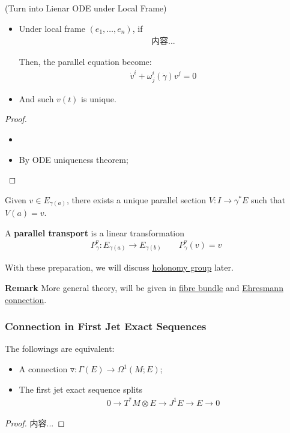 \documentclass[Total.tex]{subfiles}
\begin{document}
				
				\begin{proposition}
					(Turn into Lienar ODE under Local Frame) 
					\begin{itemize}
						\item Under local frame $(e_1,\dots,e_n)$, if 
						\begin{gather*}
							内容...
						\end{gather*}
						
						Then, the parallel equation become:
						\begin{gather*}
							\dot{v}^i+\omega^i_j(\dot{\gamma})v^j=0
						\end{gather*}
						\item And such $v(t)$ is unique. 
					\end{itemize}
				\end{proposition}
				\begin{proof}
					\begin{itemize}
						\item 
						\item By ODE uniqueness theorem;
					\end{itemize}
				\end{proof}
				
				
				
				\begin{Def}
					Given $v\in E_{\gamma(a)}$, there exists a unique parallel section $V:I\rightarrow \gamma^*E$ such that $V(a)=v$.
					
					A \textbf{parallel transport} is a linear transformation
					\begin{gather*}
						P^\triangledown_\gamma:E_{\gamma(a)}\rightarrow E_{\gamma(b)}\qquad P^\triangledown_\gamma(v)=v
					\end{gather*}
				\end{Def}
				
				With these preparation, we will discuss \underline{holonomy group} later. 
				
				\textbf{Remark} More general theory, will be given in \underline{fibre bundle} and \underline{Ehresmann connection}. 
			\subsubsection{Connection in First Jet Exact Sequences}
				\begin{proposition}
					The followings are equivalent:
					\begin{itemize}
						\item A connection $\triangledown:\Gamma(E)\rightarrow \Omega^1(M;E)$;
						\item The first jet exact sequence splits
						\begin{gather*}
							0\rightarrow T^*M\otimes E\rightarrow J^1E\rightarrow E\rightarrow 0
						\end{gather*}
					\end{itemize}
				\end{proposition}
				\begin{proof}
					内容...
				\end{proof}
\end{document}
